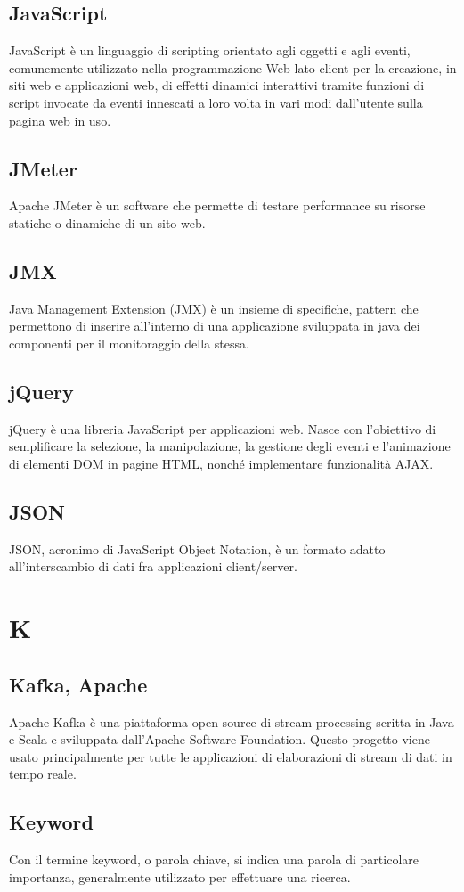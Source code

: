 \subsection{JavaScript}  JavaScript è un linguaggio di scripting orientato agli oggetti e agli eventi, comunemente utilizzato nella programmazione Web lato client per la creazione, in siti web e applicazioni web, di effetti dinamici interattivi tramite funzioni di script invocate da eventi innescati a loro volta in vari modi dall'utente sulla pagina web in uso. 
\subsection{JMeter}  Apache JMeter è un software che permette di testare performance su risorse statiche o dinamiche di un sito web.
\subsection{JMX}  Java Management Extension (JMX) è un insieme di specifiche, pattern che permettono di inserire all'interno di una applicazione sviluppata in java dei componenti per il monitoraggio della stessa.
\subsection{jQuery}  jQuery è una libreria JavaScript per applicazioni web. Nasce con l'obiettivo di semplificare la selezione, la manipolazione, la gestione degli eventi e l'animazione di elementi DOM in pagine HTML, nonché implementare funzionalità AJAX.
\subsection{JSON }  JSON, acronimo di JavaScript Object Notation, è un formato adatto all'interscambio di dati fra applicazioni client/server.

\newpage \section{K}
\subsection{Kafka, Apache}  Apache Kafka è una piattaforma open source di stream processing scritta in Java e Scala e sviluppata dall'Apache Software Foundation.  Questo progetto viene usato principalmente per tutte le applicazioni di elaborazioni di stream di dati in tempo reale.
\subsection{Keyword}  Con il termine keyword, o parola chiave, si indica una parola di particolare importanza, generalmente utilizzato per effettuare una ricerca.
